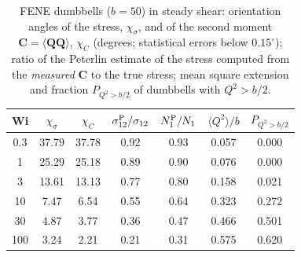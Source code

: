 \begin{table}
\caption{FENE dumbbells ($b=50$) in steady shear: orientation angles of the stress, $\chi_\sigma$, and of the second moment $\bm C=\langle\bm Q\bm Q\rangle$, $\chi_C$ (degrees; statistical errors below $0.15^\circ$); ratio of the Peterlin estimate of the stress computed from the \emph{measured} $\bm C$ to the true stress; mean square extension and fraction $P_{Q^2>b/2}$ of dumbbells with $Q^2>b/2$.}\label{tab:coax}
\begin{ruledtabular}
\begin{tabular}{ccccccc}
Wi & $\chi_\sigma$ & $\chi_C$ & $\sigma_{12}^{\rm P}/\sigma_{12}$ & $N_1^{\rm P}/N_1$ & $\langle Q^2\rangle/b$ & $P_{Q^2>b/2}$\\
\hline
0.3 & 37.79 & 37.78 & 0.92 & 0.93 & 0.057 & 0.000 \\
1 & 25.29 & 25.18 & 0.89 & 0.90 & 0.076 & 0.000 \\
3 & 13.61 & 13.13 & 0.77 & 0.80 & 0.158 & 0.021 \\
10 & 7.47 & 6.54 & 0.55 & 0.64 & 0.323 & 0.272 \\
30 & 4.87 & 3.77 & 0.36 & 0.47 & 0.466 & 0.501 \\
100 & 3.24 & 2.21 & 0.21 & 0.31 & 0.575 & 0.620 \\
\end{tabular}
\end{ruledtabular}
\end{table}
